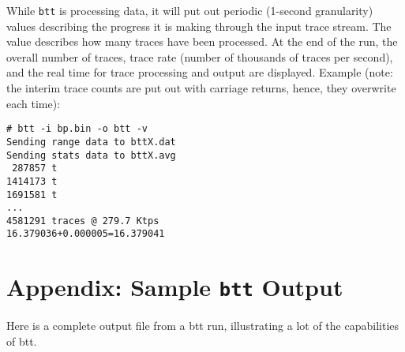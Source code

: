 \documentclass{article}
\begin{document}
  While \texttt{btt} is processing data, it will put out periodic (1-second
  granularity) values describing the progress it is making through the
  input trace stream. The value describes how many traces have been
  processed. At the end of the run, the overall number of traces, trace
  rate (number of thousands of traces per second), and the real time for
  trace processing and output are displayed. Example (note: the interim
  trace counts are put out with carriage returns, hence, they overwrite
  each time):

\begin{verbatim}
# btt -i bp.bin -o btt -v
Sending range data to bttX.dat
Sending stats data to bttX.avg
 287857 t
1414173 t
1691581 t
...
4581291 traces @ 279.7 Ktps
16.379036+0.000005=16.379041
\end{verbatim}

\newpage\section{\label{sec:appendix}Appendix: Sample \texttt{btt}
Output}
  
  Here is a complete output file from a btt run, illustrating a lot of the
  capabilities of btt.
\end{document}
